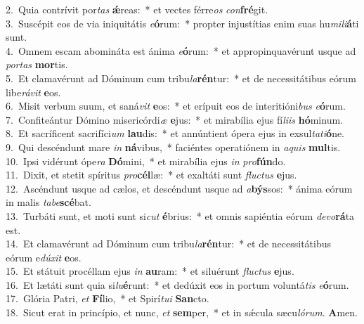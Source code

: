 {2.~}Quia contrívit por\textit{tas} \textbf{ǽ}reas:~* et vectes férre\textit{os} \textit{con}\textbf{fré}git.\\
{3.~}Suscépit eos de via iniquitátis \textit{e}\textbf{ó}rum:~* propter injustítias enim suas hu\textit{mi}\textit{li}\textbf{á}ti sunt.\\
{4.~}Omnem escam abomináta est ánima \textit{e}\textbf{ó}rum:~* et appropinquavérunt usque ad \textit{por}\textit{tas} \textbf{mor}tis.\\
{5.~}Et clamavérunt ad Dóminum cum tribu\textit{la}\textbf{rén}tur:~* et de necessitátibus eórum libe\textit{rá}\textit{vit} \textbf{e}os.\\
{6.~}Misit verbum suum, et saná\textit{vit} \textbf{e}os:~* et erípuit eos de interitióni\textit{bus} \textit{e}\textbf{ó}rum.\\
{7.~}Confiteántur Dómino misericórdi\textit{æ} \textbf{e}jus:~* et mirabília ejus fí\textit{li}\textit{is} \textbf{hó}minum.\\
{8.~}Et sacríficent sacrifíci\textit{um} \textbf{lau}dis:~* et annúntient ópera ejus in exsul\textit{ta}\textit{ti}\textbf{ó}ne.\\
{9.~}Qui descéndunt mare \textit{in} \textbf{ná}vibus,~* faciéntes operatiónem in \textit{a}\textit{quis} \textbf{mul}tis.\\
{10.~}Ipsi vidérunt ópe\textit{ra} \textbf{Dó}mini,~* et mirabília ejus \textit{in} \textit{pro}\textbf{fún}do.\\
{11.~}Dixit, et stetit spíritus \textit{pro}\textbf{cél}læ:~* et exaltáti sunt \textit{flu}\textit{ctus} \textbf{e}jus.\\
{12.~}Ascéndunt usque ad cælos, et descéndunt usque ad \textit{a}\textbf{býs}sos:~* ánima eórum in malis \textit{ta}\textit{be}\textbf{scé}bat.\\
{13.~}Turbáti sunt, et moti sunt si\textit{cut} \textbf{é}brius:~* et omnis sapiéntia eórum \textit{de}\textit{vo}\textbf{rá}ta est.\\
{14.~}Et clamavérunt ad Dóminum cum tribu\textit{la}\textbf{rén}tur:~* et de necessitátibus eórum e\textit{dú}\textit{xit} \textbf{e}os.\\
{15.~}Et státuit procéllam ejus \textit{in} \textbf{au}ram:~* et siluérunt \textit{flu}\textit{ctus} \textbf{e}jus.\\
{16.~}Et lætáti sunt quia si\textit{lu}\textbf{é}runt:~* et dedúxit eos in portum voluntá\textit{tis} \textit{e}\textbf{ó}rum.\\
{17.~}Glória Patri, \textit{et} \textbf{Fí}lio,~* et Spirí\textit{tu}\textit{i} \textbf{San}cto.\\
{18.~}Sicut erat in princípio, et nunc, \textit{et} \textbf{sem}per,~* et in sǽcula sæcu\textit{ló}\textit{rum}. \textbf{A}men.\\

